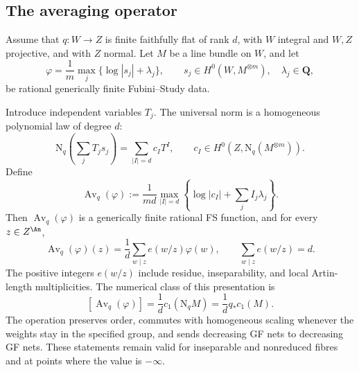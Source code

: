 \subsection{The averaging operator}
\label{sec:ch41-average-operator}

\begin{proposition}\label{prop:bj-weighted-coefficient-norm}
Assume that $q:W\to Z$ is finite faithfully flat of rank $d$, with
$W$ integral and $W,Z$ projective, and with $Z$ normal.  Let $M$ be a line bundle on
$W$, and let
\[
 \varphi=\frac1m\max_j\{\log|s_j|+\lambda_j\},
 \qquad
 s_j\in H^0(W,M^{\otimes m}),\quad
 \lambda_j\in\mathbf Q,
\tag{41.23}\label{eq:bj-weighted-fs-upstairs}
\]
be rational generically finite Fubini--Study data.

Introduce independent variables $T_j$.  The universal norm is a
homogeneous polynomial law of degree $d$:
\[
 \mathrm N_q\left(\sum_jT_js_j\right)
     =\sum_{|I|=d}c_IT^I,
 \qquad
 c_I\in H^0\left(
 Z,\mathrm N_q(M^{\otimes m})\right).
\tag{41.24}\label{eq:bj-universal-norm-polynomial}
\]
Define
\[
 \operatorname{Av}_q(\varphi):=
 \frac1{md}\max_{|I|=d}
 \left\{\log|c_I|+\sum_jI_j\lambda_j\right\}.
\tag{41.25}\label{eq:bj-weighted-average-definition}
\]
Then $\operatorname{Av}_q(\varphi)$ is a generically finite rational FS function, and
for every $z\in Z^{\An}$,
\[
 \operatorname{Av}_q(\varphi)(z)
 =\frac1d\sum_{w\mid z}e(w/z)\varphi(w),
 \qquad
 \sum_{w\mid z}e(w/z)=d.
\tag{41.26}\label{eq:bj-finite-flat-average}
\]
The positive integers $e(w/z)$ include residue, inseparability, and local
Artin-length multiplicities.  The numerical class of this presentation is
\[
 [\operatorname{Av}_q(\varphi)]
   =\frac1d c_1(\mathrm N_qM)
   =\frac1d q_*c_1(M).
\tag{41.27}\label{eq:bj-norm-class}
\]
The operation preserves order, commutes with homogeneous scaling whenever the weights stay in the
specified group, and
sends decreasing GF nets to decreasing GF nets.  These statements remain
valid for inseparable and nonreduced fibres and at points where the value
is $-\infty$.
\end{proposition}


